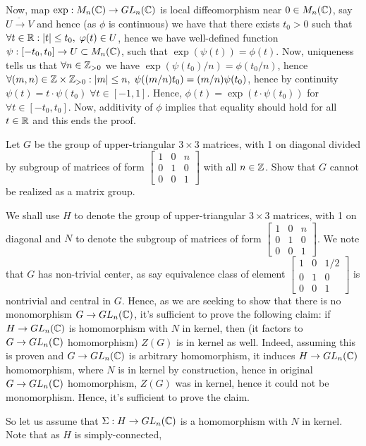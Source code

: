 \documentclass[8pt]{article} %
\newcommand{\myprobshort}[2]{\begin{myprob}[#1]#2\end{myprob}}
\begin{document}
Now, map $\exp:M_n(\mathbb{C})\to GL_n(\mathbb{C})$ is local diffeomorphism near $0\in M_n(\mathbb{C})$, say $U\xrightarrow{ \widetilde{} }V$
and hence (as $\phi$ is continuous) we have that
there exists $t_0>0$ such that $\forall t\in\mathbb{R}:\left|t\right|\leq t_0,\;\varphi(t)\in U$, hence we have well-defined function
$\psi:[-t_0,t_0]\to U\subset M_n(\mathbb{C})$, such that $\exp(\psi(t))=\phi(t)$. Now, uniqueness tells us that
$\forall n\in\mathbb{Z}_{>0}$ we have $\exp(\psi(t_0)/n)=\phi(t_0/n)$, hence $\forall (m,n)\in \mathbb{Z}\times\mathbb{Z}_{>0}:\left|m\right|\leq n,\;
\psi((m/n)t_0)=(m/n)\psi(t_0)$, hence by continuity $\psi(t)=t\cdot\psi(t_0)\;\forall t\in[-1,1]$. Hence, $\phi(t)=\exp(t\cdot
\psi(t_0))$ for $\forall t\in[-t_0,t_0]$. Now, additivity of $\phi$ implies that equality should hold for all $t\in\mathbb{R}$ and this
ends the proof.
\myprobshort{April 7, Exercise 1.4.5}{Let $G$ be the group of upper-triangular $3\times3$ matrices, with 1 on diagonal divided
by subgroup of matrices of form $\left[\begin{smallmatrix}1&0&n\\0&1&0\\0&0&1\end{smallmatrix}\right]$
with all $n\in\mathbb{Z}$. Show that $G$ cannot be realized as a matrix group.}
We shall use $H$ to denote the group of upper-triangular $3\times3$ matrices, with 1 on diagonal and $N$ to denote the
subgroup of matrices of form $\left[\begin{smallmatrix}1&0&n\\0&1&0\\0&0&1\end{smallmatrix}\right]$.
We note that $G$ has non-trivial center, as say equivalence class of element
$\left[\begin{smallmatrix}1&0&1/2\\0&1&0\\0&0&1\end{smallmatrix}\right]$ is nontrivial and central in $G$. Hence, as we
are seeking to show that there is no monomorphism $G\to GL_n(\mathbb{C})$, it's sufficient to prove the following claim: if 
$H\to GL_n(\mathbb{C})$ is homomorphism with $N$ in kernel, then (it factors to $G\to GL_n(\mathbb{C})$ homomorphism) $Z(G)$ is in kernel as well.
Indeed, assuming this is proven and $G\to GL_n(\mathbb{C})$ is arbitrary
homomorphism, it induces $H\to GL_n(\mathbb{C})$ homomorphism, where $N$ is in
kernel by construction, hence in original $G\to GL_n(\mathbb{C})$ homomorphism, $Z(G)$ was in kernel, hence it could not be monomorphism. 
Hence, it's sufficient to prove the claim.\par
So let us assume that $\Sigma: H\to GL_n(\mathbb{C})$ is a homomorphism with $N$ in kernel. Note that as $H$ is simply-connected,
\end{document}
